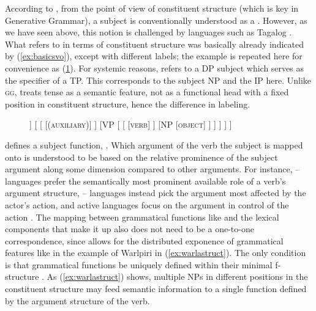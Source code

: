 According to \citet{carnie2013}, from the point of view of constituent
structure (which is key in Generative Grammar), a subject is conventionally
understood as a . However, as
we have seen above, this notion is challenged by languages such as Tagalog
\citep[225]{kroeger1991}. What \citet{carnie2013} refers to in terms of
constituent structure was basically already indicated by (\ref{ex:basicsvo}),
except with different labels; the example is repeated here for convenience as
(\ref{ex:basicsvo2}). For systemic reasons, \citet{carnie2013} refers to a DP
subject which serves as the specifier of a TP. This corresponds to the subject
NP and the IP here. Unlike \textsc{gg}, \Lfg{} treats tense as a semantic
feature, not as a functional head with a fixed position in constituent
structure, hence the difference in labeling.

\begin{figure}
\ex\label{ex:basicsvo2}
\begin{forest}
[IP
	[NP
		[\textsc{subject}]
	]
	[
		[
			[\textsc{(auxiliary)}]
		]
		[VP
			[
				[
					[\textsc{verb}]
				]
				[NP
					[\textsc{object}]
				]
			]
		]
	]
]
\end{forest}
\xe
\end{figure}

\Lfg{} defines a subject function, \Subj{}. Which argument of the verb the
subject is mapped onto is understood to be based on the relative prominence of
the subject argument along some dimension compared to other arguments. For
instance, \Nom{}--\Acc{} languages prefer the semantically most prominent
available role of a verb's argument structure, \Erg{}--\Abs{} languages instead
pick the argument most affected by the actor's action, and active languages
focus on the argument in control of the action \citep[95--96]{bresnan2016}. The
mapping between grammatical functions like \Subj{} and the lexical components
that make it up also does not need to be a one-to-one correspondence, since
\Lfg{} allows for the distributed exponence of grammatical features like in the
example of Warlpiri in (\ref{ex:warlastruct}). The only condition is that
grammatical functions be uniquely defined within their minimal f-structure
\citep[45]{bresnan2016}. As (\ref{ex:warlastruct}) shows, multiple NPs in
different positions in the constituent structure may feed semantic information
to a single function defined by the argument structure of the verb.

